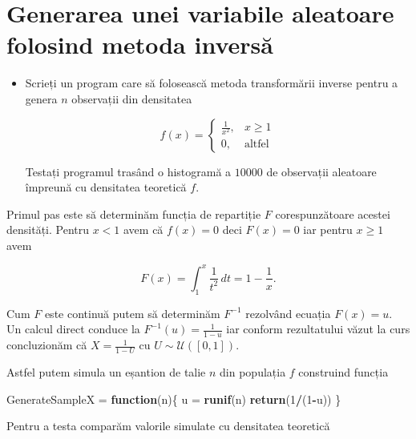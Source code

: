 \documentclass[]{article}
\newenvironment{Shaded}{\begin{snugshade}}{\end{snugshade}}
\newcommand{\ControlFlowTok}[1]{\textcolor[rgb]{0.13,0.29,0.53}{\textbf{#1}}}
\newcommand{\DecValTok}[1]{\textcolor[rgb]{0.00,0.00,0.81}{#1}}
\newcommand{\KeywordTok}[1]{\textcolor[rgb]{0.13,0.29,0.53}{\textbf{#1}}}
\newcommand{\NormalTok}[1]{#1}
\newcommand{\OperatorTok}[1]{\textcolor[rgb]{0.81,0.36,0.00}{\textbf{#1}}}
\newcommand{\StringTok}[1]{\textcolor[rgb]{0.31,0.60,0.02}{#1}}
\newenvironment{frshaded*}{%
  \def\FrameCommand{\fboxrule=\FrameRule\fboxsep=\FrameSep \fcolorbox{framecolor}{shadecolor1}}%
  \MakeFramed {\advance\hsize-\width \FrameRestore}}%
{\endMakeFramed}
\newenvironment{rmdblock}[1]
  {\begin{frshaded*}
  \begin{itemize}
  \renewcommand{\labelitemi}{
    \raisebox{-.7\height}[0pt][0pt]{
      {\setkeys{Gin}{width=2em,keepaspectratio}\texttt{[image: images/icons/\#1]}}
    }
  }
  \item
  }
  {
  \end{itemize}
  \end{frshaded*}
  }
\newenvironment{rmdexercise}
  {\begin{rmdblock}{exercise}}
  {\end{rmdblock}}
\begin{document}
\hypertarget{generarea-unei-variabile-aleatoare-folosind-metoda-inversux103}{%
\section{Generarea unei variabile aleatoare folosind metoda
inversă}\label{generarea-unei-variabile-aleatoare-folosind-metoda-inversux103}}

\begin{rmdexercise}
Scrieți un program care să folosească metoda transformării inverse
pentru a genera \(n\) observații din densitatea

\[
  f(x) = \left\{\begin{array}{ll}
        \frac{1}{x^2}, & x\geq 1\\
        0, & \text{altfel}
  \end{array}\right.
\]

Testați programul trasând o histogramă a \(10000\) de observații
aleatoare împreună cu densitatea teoretică \(f\).
\end{rmdexercise}

Primul pas este să determinăm funcția de repartiție \(F\)
corespunzătoare acestei densități. Pentru \(x<1\) avem că \(f(x)=0\)
deci \(F(x)=0\) iar pentru \(x\geq 1\) avem

\[
  F(x) = \int_{1}^{x}\frac{1}{t^2}\, dt = 1 - \frac{1}{x}.
\]

Cum \(F\) este continuă putem să determinăm \(F^{-1}\) rezolvând ecuația
\(F(x)=u\). Un calcul direct conduce la \(F^{-1}(u)=\frac{1}{1-u}\) iar
conform rezultatului văzut la curs concluzionăm că \(X = \frac{1}{1-U}\)
cu \(U\sim \mathcal{U}([0,1])\).

Astfel putem simula un eșantion de talie \(n\) din populația \(f\)
construind funcția

\begin{Shaded}
\begin{Highlighting}[]
\NormalTok{GenerateSampleX =}\StringTok{ }\ControlFlowTok{function}\NormalTok{(n)\{}
\NormalTok{  u =}\StringTok{ }\KeywordTok{runif}\NormalTok{(n)}
  \KeywordTok{return}\NormalTok{(}\DecValTok{1}\OperatorTok{/}\NormalTok{(}\DecValTok{1}\OperatorTok{-}\NormalTok{u))}
\NormalTok{\}}
\end{Highlighting}
\end{Shaded}

Pentru a testa comparăm valorile simulate cu densitatea teoretică
\end{document}
